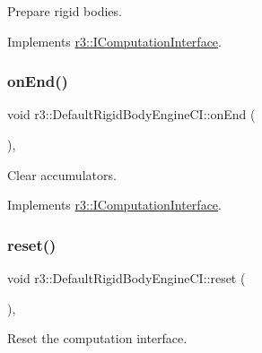 Prepare rigid bodies. 



Implements \mbox{\hyperlink{classr3_1_1_i_computation_interface_a430ebc9cb8d4ba064ac6a032ef07edd7}{r3\+::\+I\+Computation\+Interface}}.

\mbox{\label{classr3_1_1_default_rigid_body_engine_c_i_ad7746126ebd5aab4cfc352dd9facabb2}} 
\subsubsection{\texorpdfstring{on\+End()}{onEnd()}}
{\footnotesize\ttfamily void r3\+::\+Default\+Rigid\+Body\+Engine\+C\+I\+::on\+End (\begin{DoxyParamCaption}{ }\end{DoxyParamCaption})\hspace{0.3cm}{\ttfamily [override]}, {\ttfamily [virtual]}}



Clear accumulators. 



Implements \mbox{\hyperlink{classr3_1_1_i_computation_interface_acae0c5fada7e414c74fe6f5a8f4a6c7d}{r3\+::\+I\+Computation\+Interface}}.

\mbox{\label{classr3_1_1_default_rigid_body_engine_c_i_a06bd27e94b26017e7960e01f6e884e33}} 
\subsubsection{\texorpdfstring{reset()}{reset()}}
{\footnotesize\ttfamily void r3\+::\+Default\+Rigid\+Body\+Engine\+C\+I\+::reset (\begin{DoxyParamCaption}{ }\end{DoxyParamCaption})\hspace{0.3cm}{\ttfamily [override]}, {\ttfamily [virtual]}}



Reset the computation interface. 



